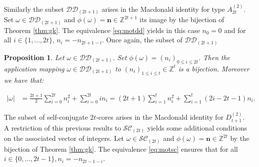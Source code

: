 \documentclass[11pt,letterpaper]{amsart}
\def\bbbz{\mathbb Z}
\def\ccsc{\mathcal {SC}}
\def\ccdd{\mathcal {DD}}
\newtheorem{prop}[df]{Proposition}		%
\numberwithin{equation}{section}
\numberwithin{df}{section}
\begin{document}
Similarly the subset $\ccdd_{(2t+1)}$ arises in the Macdonald identity for type $A^{(2)}_{2t}$. Set $\omega\in\ccdd_{(2t+1)}$ and $\phi(\omega)=\mathbf{n}\in\bbbz^{2t+1}$ its image by the bijection of Theorem \ref{thm:gk}. The equivalence \eqref{eq:motdd} yields in this case $n_0=0$ and for all $i\in\lbrace 1,\dots,2t\rbrace$, $n_i=-n_{2t+1-i}$. Once again, the subset of $\ccdd_{(2t+1)}$



\begin{prop}\label{prop:dd2t+1}\cite[Bijection $4$]{GKS}
Let $\omega\in \ccdd_{(2t+1)}$. Set $\phi(\omega)=(n_i)_{0\leq i\leq 2t}$. Then the application mapping $\omega\in\ccdd_{(2t+1)}$ to $(n_i)_{1\leq i\leq t}\in \mathbb{Z}^t$ is a bijection. Moreover we have that:

\begin{align}
\lvert \omega \rvert &=\frac{2t+1}{2}\sum_{i=0}^{2t}n_i^2+\sum_{i=0}^{2t}in_i=(2t+1)\sum_{i=1}^{t}n_i^2+\sum_{i=1}^{t}(2i-2t-1)n_i.\label{eq:gkddimpair}
\end{align}
\end{prop}


The subset of self-conjugate $2t$-cores arises in the Macdonald identity for $D^{(2)}_{t+1}$. A restriction of this previous results to $\ccsc_{(2t)}$ yields some additional conditions on the associated vector of integers. Let $\omega\in \ccsc_{(2t)}$ and $\phi(\omega)=\mathbf{n}\in\bbbz^{2t}$ by the bijection of Theorem \ref{thm:gk}. The equivalence \eqref{eq:motsc} ensures that for all $i \in \lbrace 0,\dots,2t-1\rbrace, n_i=-n_{2t-1-i}$. 
\end{document}
